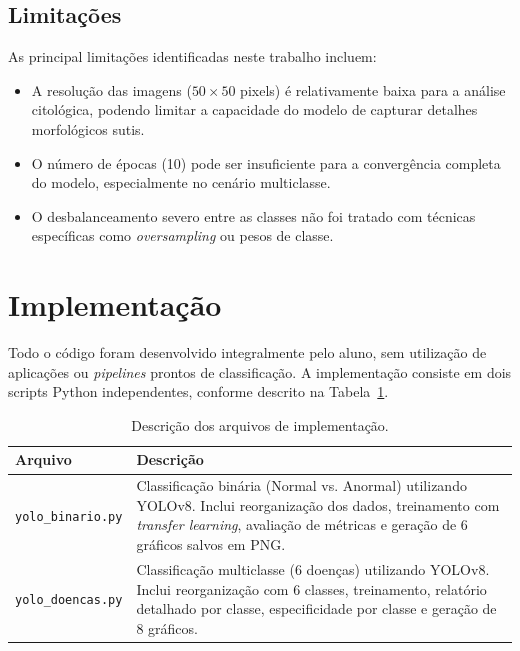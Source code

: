 \documentclass[12pt, a4paper]{article}
\begin{document}
\subsection{Limitações}

As principal limitações identificadas neste trabalho incluem:

\begin{itemize}
    \item A resolução das imagens ($50 \times 50$ pixels) é relativamente baixa para a análise citológica, podendo limitar a capacidade do modelo de capturar detalhes morfológicos sutis.
    \item O número de épocas (10) pode ser insuficiente para a convergência completa do modelo, especialmente no cenário multiclasse.
    \item O desbalanceamento severo entre as classes não foi tratado com técnicas específicas como \textit{oversampling} ou pesos de classe.
\end{itemize}

\section{Implementação}

Todo o código foram desenvolvido integralmente pelo aluno, sem utilização de aplicações ou \textit{pipelines} prontos de classificação. A implementação consiste em dois scripts Python independentes, conforme descrito na Tabela~\ref{tab:arquivos}.

\begin{table}[H]
\centering
\caption{Descrição dos arquivos de implementação.}
\label{tab:arquivos}
\begin{tabular}{lp{9.5cm}}
\toprule
\textbf{Arquivo} & \textbf{Descrição} \\
\midrule
\texttt{yolo\_binario.py} & Classificação binária (Normal vs. Anormal) utilizando YOLOv8. Inclui reorganização dos dados, treinamento com \textit{transfer learning}, avaliação de métricas e geração de 6 gráficos salvos em PNG. \\
\addlinespace
\texttt{yolo\_doencas.py} & Classificação multiclasse (6 doenças) utilizando YOLOv8. Inclui reorganização com 6 classes, treinamento, relatório detalhado por classe, especificidade por classe e geração de 8 gráficos. \\
\bottomrule
\end{tabular}
\end{table}
\end{document}
